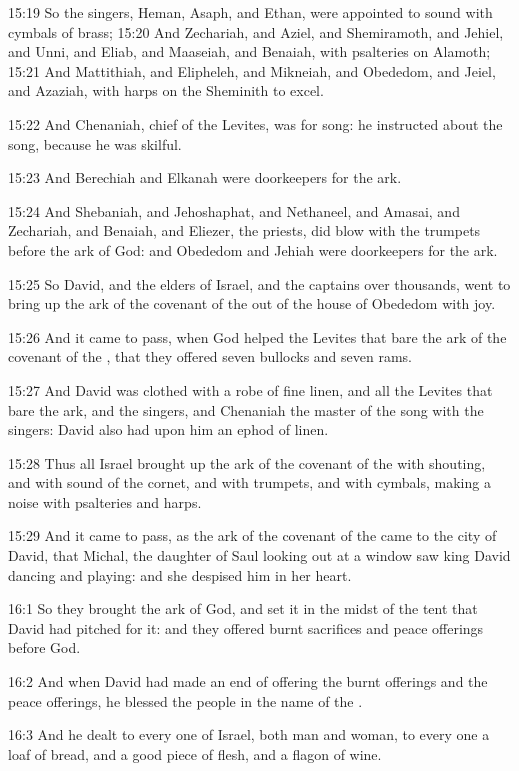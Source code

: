15:19 So the singers, Heman, Asaph, and Ethan, were appointed to sound
with cymbals of brass; 15:20 And Zechariah, and Aziel, and
Shemiramoth, and Jehiel, and Unni, and Eliab, and Maaseiah, and
Benaiah, with psalteries on Alamoth; 15:21 And Mattithiah, and
Elipheleh, and Mikneiah, and Obededom, and Jeiel, and Azaziah, with
harps on the Sheminith to excel.

15:22 And Chenaniah, chief of the Levites, was for song: he instructed
about the song, because he was skilful.

15:23 And Berechiah and Elkanah were doorkeepers for the ark.

15:24 And Shebaniah, and Jehoshaphat, and Nethaneel, and Amasai, and
Zechariah, and Benaiah, and Eliezer, the priests, did blow with the
trumpets before the ark of God: and Obededom and Jehiah were
doorkeepers for the ark.

15:25 So David, and the elders of Israel, and the captains over
thousands, went to bring up the ark of the covenant of the \LORD out of
the house of Obededom with joy.

15:26 And it came to pass, when God helped the Levites that bare the
ark of the covenant of the \LORD, that they offered seven bullocks and
seven rams.

15:27 And David was clothed with a robe of fine linen, and all the
Levites that bare the ark, and the singers, and Chenaniah the master
of the song with the singers: David also had upon him an ephod of
linen.

15:28 Thus all Israel brought up the ark of the covenant of the \LORD
with shouting, and with sound of the cornet, and with trumpets, and
with cymbals, making a noise with psalteries and harps.

15:29 And it came to pass, as the ark of the covenant of the \LORD came
to the city of David, that Michal, the daughter of Saul looking out at
a window saw king David dancing and playing: and she despised him in
her heart.

16:1 So they brought the ark of God, and set it in the midst of the
tent that David had pitched for it: and they offered burnt sacrifices
and peace offerings before God.

16:2 And when David had made an end of offering the burnt offerings
and the peace offerings, he blessed the people in the name of the
\LORD.

16:3 And he dealt to every one of Israel, both man and woman, to every
one a loaf of bread, and a good piece of flesh, and a flagon of wine.

